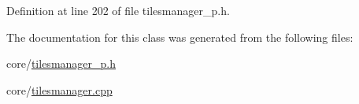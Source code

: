 Definition at line 202 of file tilesmanager\+\_\+p.\+h.



The documentation for this class was generated from the following files\+:\begin{DoxyCompactItemize}
\item 
core/\hyperlink{tilesmanager__p_8h}{tilesmanager\+\_\+p.\+h}\item 
core/\hyperlink{tilesmanager_8cpp}{tilesmanager.\+cpp}\end{DoxyCompactItemize}

